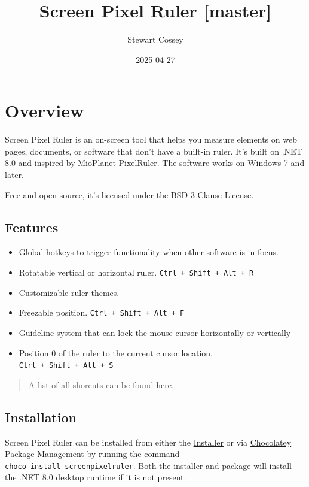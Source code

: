 \documentclass[
]{book}
\title{Screen Pixel Ruler {[}master{]}}
\author{Stewart Cossey}
\date{2025-04-27}
\providecommand{\tightlist}{%
  \setlength{\itemsep}{0pt}\setlength{\parskip}{0pt}}
\begin{document}
\maketitle

{
\setcounter{tocdepth}{1}
\tableofcontents
}
\chapter{Overview}\label{overview}

Screen Pixel Ruler is an on-screen tool that helps you measure elements on web pages, documents, or software that don't have a built-in ruler.
It's built on .NET 8.0 and inspired by MioPlanet PixelRuler.
The software works on Windows 7 and later.

Free and open source, it's licensed under the \href{https://opensource.org/licenses/BSD-3-Clause}{BSD 3-Clause License}.

\section{Features}\label{features}

\begin{itemize}
\tightlist
\item
  Global hotkeys to trigger functionality when other software is in focus.
\item
  Rotatable vertical or horizontal ruler. \texttt{Ctrl\ +\ Shift\ +\ Alt\ +\ R}
\item
  Customizable ruler themes.
\item
  Freezable position. \texttt{Ctrl\ +\ Shift\ +\ Alt\ +\ F}
\item
  Guideline system that can lock the mouse cursor horizontally or vertically
\item
  Position 0 of the ruler to the current cursor location. \texttt{Ctrl\ +\ Shift\ +\ Alt\ +\ S}
\end{itemize}

\begin{quote}
A list of all shorcuts can be found \hyperref[keyboard]{here}.
\end{quote}

\section{Installation}\label{installation}

Screen Pixel Ruler can be installed from either the \href{https://github.com/Cossey/ScreenPixelRuler2/releases}{Installer} or via \href{https://chocolatey.org}{Chocolatey Package Management} by running the command \texttt{choco\ install\ screenpixelruler}.
Both the installer and package will install the .NET 8.0 desktop runtime if it is not present.
\end{document}
